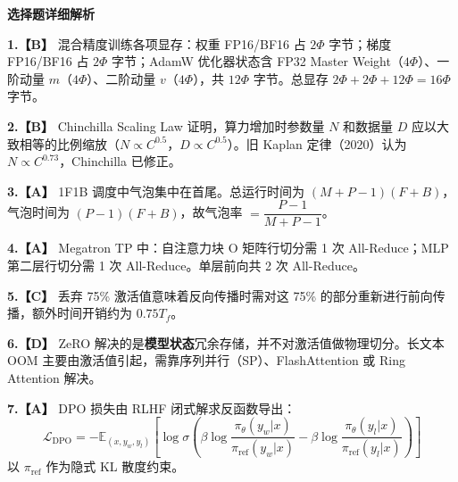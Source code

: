 \documentclass[a4paper]{ctexart}
\newcommand{\bodyfont}{\fontsize{12pt}{16pt}\selectfont}
\begin{document}
\vspace{0.8em}

{\bodyfont\heiti\bfseries 选择题详细解析}

\vspace{0.4em}

\noindent\textbf{1.【B】} 混合精度训练各项显存：权重 FP16/BF16 占 $2\Phi$ 字节；梯度 FP16/BF16 占 $2\Phi$ 字节；AdamW 优化器状态含 FP32 Master Weight（$4\Phi$）、一阶动量 $m$（$4\Phi$）、二阶动量 $v$（$4\Phi$），共 $12\Phi$ 字节。总显存 $2\Phi+2\Phi+12\Phi=16\Phi$ 字节。

\vspace{0.5em}

\noindent\textbf{2.【B】} Chinchilla Scaling Law 证明，算力增加时参数量 $N$ 和数据量 $D$ 应以大致相等的比例缩放（$N\propto C^{0.5}$，$D\propto C^{0.5}$）。旧 Kaplan 定律（2020）认为 $N\propto C^{0.73}$，Chinchilla 已修正。

\vspace{0.5em}

\noindent\textbf{3.【A】} 1F1B 调度中气泡集中在首尾。总运行时间为 $(M+P-1)(F+B)$，气泡时间为 $(P-1)(F+B)$，故气泡率 $=\dfrac{P-1}{M+P-1}$。

\vspace{0.5em}

\noindent\textbf{4.【A】} Megatron TP 中：自注意力块 O 矩阵行切分需 1 次 All-Reduce；MLP 第二层行切分需 1 次 All-Reduce。单层前向共 2 次 All-Reduce。

\vspace{0.5em}

\noindent\textbf{5.【C】} 丢弃 75\% 激活值意味着反向传播时需对这 75\% 的部分重新进行前向传播，额外时间开销约为 $0.75 T_f$。

\vspace{0.5em}

\noindent\textbf{6.【D】} ZeRO 解决的是\textbf{模型状态}冗余存储，并不对激活值做物理切分。长文本 OOM 主要由激活值引起，需靠序列并行（SP）、FlashAttention 或 Ring Attention 解决。

\vspace{0.5em}

\noindent\textbf{7.【A】} DPO 损失由 RLHF 闭式解求反函数导出：
$$\mathcal{L}_{\mathrm{DPO}}=-\mathbb{E}_{(x,y_w,y_l)}\!\left[\log\sigma\!\left(\beta\log\frac{\pi_\theta(y_w|x)}{\pi_{\mathrm{ref}}(y_w|x)}-\beta\log\frac{\pi_\theta(y_l|x)}{\pi_{\mathrm{ref}}(y_l|x)}\right)\right]$$
以 $\pi_{\mathrm{ref}}$ 作为隐式 KL 散度约束。

\vspace{0.5em}
\end{document}
